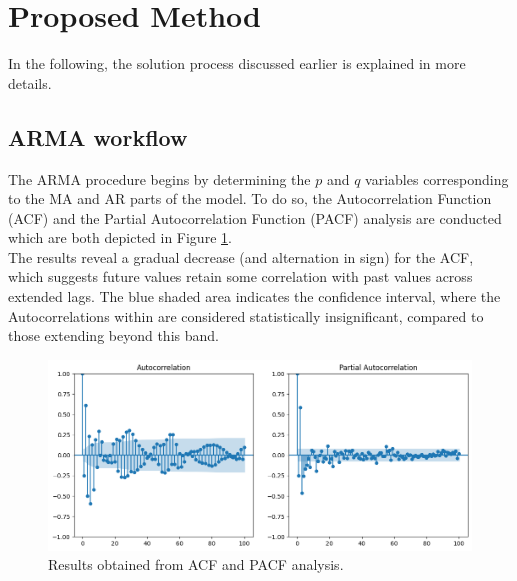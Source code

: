 \documentclass{article}
\begin{document}
\section{Proposed Method}
In the following, the solution process discussed earlier is explained in more details.
\subsection{ARMA workflow}
The ARMA procedure begins by determining the $p$ and $q$ variables corresponding to the MA and AR parts of the model. To do so, the Autocorrelation Function (ACF) and the Partial Autocorrelation Function (PACF) analysis are conducted which are both depicted in Figure \ref{fig:acf-pacf}.\\
The results reveal a gradual decrease (and alternation in sign) for the ACF, which suggests future values retain some correlation with past values across extended lags. The blue shaded area indicates the confidence interval, where  the Autocorrelations within are considered statistically insignificant, compared to those extending beyond this band.
\begin{figure} [h]
    \centering
    \includegraphics[width=\linewidth]{Fig02.png}
    \caption{\label{fig:acf-pacf} Results obtained from ACF and PACF analysis.}
\end{figure}
\end{document}
